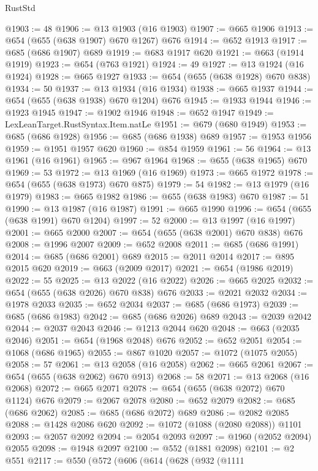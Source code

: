 \begin{lexlean}{RustStd}
\begin{coremodule}
@1903 := 48
@1906 := @13 @1903 (@16 @1903)
@1907 := @665 @1906
@1913 := @654 (@655 (@638 @1907) @670 @1267) @676
@1914 := @652 @1913
@1917 := @685 (@686 @1907) @689
@1919 := @683 @1917 @620
@1921 := @663 (@1914 @1919)
@1923 := @654 (@763 @1921)
@1924 := 49
@1927 := @13 @1924 (@16 @1924)
@1928 := @665 @1927
@1933 := @654 (@655 (@638 @1928) @670 @838)
@1934 := 50
@1937 := @13 @1934 (@16 @1934)
@1938 := @665 @1937
@1944 := @654 (@655 (@638 @1938) @670 @1204) @676
@1945 := @1933 @1944
@1946 := @1923 @1945
@1947 := @1902 @1946
@1948 := @652 @1947
@1949 := LexLeanTarget.RustSyntax.Item.natLe
@1951 := @679 (@680 @1949)
@1953 := @685 (@686 @1928)
@1956 := @685 (@686 @1938) @689
@1957 := @1953 @1956
@1959 := @1951 @1957 @620
@1960 := @854 @1959
@1961 := 56
@1964 := @13 @1961 (@16 @1961)
@1965 := @967 @1964
@1968 := @655 (@638 @1965) @670
@1969 := 53
@1972 := @13 @1969 (@16 @1969)
@1973 := @665 @1972
@1978 := @654 (@655 (@638 @1973) @670 @875)
@1979 := 54
@1982 := @13 @1979 (@16 @1979)
@1983 := @665 @1982
@1986 := @655 (@638 @1983) @670
@1987 := 51
@1990 := @13 @1987 (@16 @1987)
@1991 := @665 @1990
@1996 := @654 (@655 (@638 @1991) @670 @1204)
@1997 := 52
@2000 := @13 @1997 (@16 @1997)
@2001 := @665 @2000
@2007 := @654 (@655 (@638 @2001) @670 @838) @676
@2008 := @1996 @2007
@2009 := @652 @2008
@2011 := @685 (@686 @1991)
@2014 := @685 (@686 @2001) @689
@2015 := @2011 @2014
@2017 := @895 @2015 @620
@2019 := @663 (@2009 @2017)
@2021 := @654 (@1986 @2019)
@2022 := 55
@2025 := @13 @2022 (@16 @2022)
@2026 := @665 @2025
@2032 := @654 (@655 (@638 @2026) @670 @838) @676
@2033 := @2021 @2032
@2034 := @1978 @2033
@2035 := @652 @2034
@2037 := @685 (@686 @1973)
@2039 := @685 (@686 @1983)
@2042 := @685 (@686 @2026) @689
@2043 := @2039 @2042
@2044 := @2037 @2043
@2046 := @1213 @2044 @620
@2048 := @663 (@2035 @2046)
@2051 := @654 (@1968 @2048) @676
@2052 := @652 @2051
@2054 := @1068 (@686 @1965)
@2055 := @867 @1020
@2057 := @1072 (@1075 @2055)
@2058 := 57
@2061 := @13 @2058 (@16 @2058)
@2062 := @665 @2061
@2067 := @654 (@655 (@638 @2062) @670 @913)
@2068 := 58
@2071 := @13 @2068 (@16 @2068)
@2072 := @665 @2071
@2078 := @654 (@655 (@638 @2072) @670 @1124) @676
@2079 := @2067 @2078
@2080 := @652 @2079
@2082 := @685 (@686 @2062)
@2085 := @685 (@686 @2072) @689
@2086 := @2082 @2085
@2088 := @1428 @2086 @620
@2092 := @1072 (@1088 (@2080 @2088)) @1101
@2093 := @2057 @2092
@2094 := @2054 @2093
@2097 := @1960 (@2052 @2094) @2055
@2098 := @1948 @2097
@2100 := @552 (@1881 @2098)
@2101 := @2 @551
@2117 := @550
    (@572
      (@606
        (@614
          (@628
            (@932
              (@1111

\end{coremodule}
\end{lexlean}
